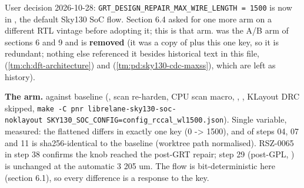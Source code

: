 \begin{record}

User decision 2026-10-28:
\texttt{GRT\_\allowbreak{}DESIGN\_\allowbreak{}REPAIR\_\allowbreak{}MAX\_\allowbreak{}WIRE\_\allowbreak{}LENGTH\ =\allowbreak{}\ 1500}
is now in , the default Sky130 SoC
flow. Section 6.4 asked for one more arm on a different RTL vintage
before adopting it; this is that arm. 
was the A/B arm of sections 6 and 9 and is \textbf{removed} (it was a
copy of  plus this one key, so it is redundant;
nothing else referenced it besides historical text in this file,
 (\cref{tm:ch:dft-architecture}) and  (\cref{tm:pd:sky130-cdc-maxss}),
which are left as history).

\textbf{The arm.}  against baseline
 (, scan re-harden, CPU scan
macro, , , KLayout DRC
skipped,
\texttt{make\ -\allowbreak{}C\ pnr\ librelane-\allowbreak{}sky130-\allowbreak{}soc-\allowbreak{}noklayout\ SKY130\_\allowbreak{}SOC\_\allowbreak{}CONFIG=\allowbreak{}config\_\allowbreak{}rccal\_\allowbreak{}wl1500.\allowbreak{}json}).
Single variable, measured: the flattened  differs in
exactly one key (0 -\textgreater{} 1500), and  of
steps 04, 07 and 11 is sha256-identical to the baseline (worktree path
normalised). RSZ-0065 in step 38 confirms the knob reached the post-GRT
repair; step 29 (post-GPL, ) is
unchanged at the automatic 3 205 um. The flow is bit-deterministic here
(section 6.1), so every difference is a response to the key.

{\footnotesize\setlength{\tabcolsep}{3pt}

}
\end{record}
